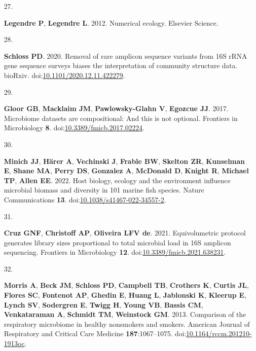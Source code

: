 \documentclass[
]{article}
\newlength{\cslhangindent}
\newlength{\csllabelwidth}
\newlength{\cslentryspacingunit} %
\newenvironment{CSLReferences}[2] %
 {%
  \setlength{\parindent}{0pt}
  \ifodd #1
  \let\oldpar\par
  \def\par{\hangindent=\cslhangindent\oldpar}
  \fi
  \setlength{\parskip}{#2\cslentryspacingunit}
 }%
 {}
\newcommand{\CSLLeftMargin}[1]{\parbox[t]{\csllabelwidth}{#1}}
\newcommand{\CSLRightInline}[1]{\parbox[t]{\linewidth - \csllabelwidth}{#1}\break}
\begin{document}
\begin{CSLReferences}{0}{1}
\leavevmode{}%
\CSLLeftMargin{27. }%
\CSLRightInline{\textbf{Legendre P}, \textbf{Legendre L}. 2012.
Numerical ecology. Elsevier Science.}

\leavevmode{}%
\CSLLeftMargin{28. }%
\CSLRightInline{\textbf{Schloss PD}. 2020. Removal of rare amplicon
sequence variants from 16S {rRNA} gene sequence surveys biases the
interpretation of community structure data. bio{R}xiv.
doi:\href{https://doi.org/10.1101/2020.12.11.422279}{10.1101/2020.12.11.422279}.}

\leavevmode{}%
\CSLLeftMargin{29. }%
\CSLRightInline{\textbf{Gloor GB}, \textbf{Macklaim JM},
\textbf{Pawlowsky-Glahn V}, \textbf{Egozcue JJ}. 2017. Microbiome
datasets are compositional: And this is not optional. Frontiers in
Microbiology \textbf{8}.
doi:\href{https://doi.org/10.3389/fmicb.2017.02224}{10.3389/fmicb.2017.02224}.}

\leavevmode{}%
\CSLLeftMargin{30. }%
\CSLRightInline{\textbf{Minich JJ}, \textbf{Härer A}, \textbf{Vechinski
J}, \textbf{Frable BW}, \textbf{Skelton ZR}, \textbf{Kunselman E},
\textbf{Shane MA}, \textbf{Perry DS}, \textbf{Gonzalez A},
\textbf{McDonald D}, \textbf{Knight R}, \textbf{Michael TP},
\textbf{Allen EE}. 2022. Host biology, ecology and the environment
influence microbial biomass and diversity in 101 marine fish species.
Nature Communications \textbf{13}.
doi:\href{https://doi.org/10.1038/s41467-022-34557-2}{10.1038/s41467-022-34557-2}.}

\leavevmode{}%
\CSLLeftMargin{31. }%
\CSLRightInline{\textbf{Cruz GNF}, \textbf{Christoff AP},
\textbf{Oliveira LFV de}. 2021. Equivolumetric protocol generates
library sizes proportional to total microbial load in 16S amplicon
sequencing. Frontiers in Microbiology \textbf{12}.
doi:\href{https://doi.org/10.3389/fmicb.2021.638231}{10.3389/fmicb.2021.638231}.}

\leavevmode{}%
\CSLLeftMargin{32. }%
\CSLRightInline{\textbf{Morris A}, \textbf{Beck JM}, \textbf{Schloss
PD}, \textbf{Campbell TB}, \textbf{Crothers K}, \textbf{Curtis JL},
\textbf{Flores SC}, \textbf{Fontenot AP}, \textbf{Ghedin E},
\textbf{Huang L}, \textbf{Jablonski K}, \textbf{Kleerup E},
\textbf{Lynch SV}, \textbf{Sodergren E}, \textbf{Twigg H}, \textbf{Young
VB}, \textbf{Bassis CM}, \textbf{Venkataraman A}, \textbf{Schmidt TM},
\textbf{Weinstock GM}. 2013. Comparison of the respiratory microbiome in
healthy nonsmokers and smokers. American Journal of Respiratory and
Critical Care Medicine \textbf{187}:1067--1075.
doi:\href{https://doi.org/10.1164/rccm.201210-1913oc}{10.1164/rccm.201210-1913oc}.}


\end{CSLReferences}
\end{document}

